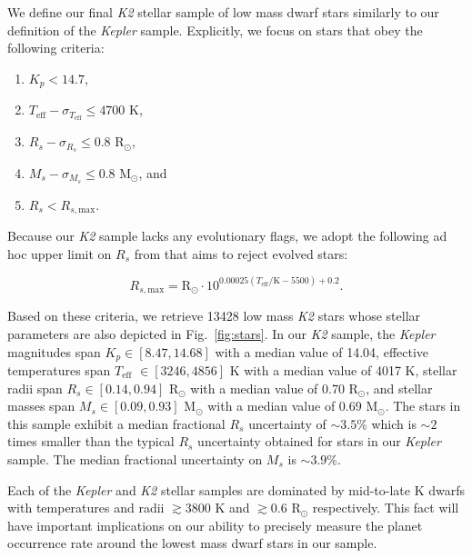 \documentclass[twocolumn]{emulateapj}
\newcommand{\kepler}[1]{\emph{Kepler}#1}
\newcommand{\ktwo}[1]{\emph{K2}#1}
\newcommand{\teff}[1]{$T_{\text{eff}}$#1}
\begin{document}
We define our final \ktwo{} stellar sample of low mass dwarf stars similarly to our definition of the \kepler{} sample.
Explicitly, we focus on stars that obey the following criteria:

\begin{enumerate}
\item $K_p < 14.7$,
\item $T_{\text{eff}} - \sigma_{T_{\text{eff}}} \leq 4700$ K,
\item $R_s - \sigma_{R_s} \leq 0.8$ R$_{\odot}$,
\item $M_s - \sigma_{M_s} \leq 0.8$ M$_{\odot}$, and
\item $R_s < R_{s,\text{max}}$.
\end{enumerate}

\noindent Because our \ktwo{} sample lacks any evolutionary flags, we adopt the following ad hoc upper limit on $R_s$
from \cite{fulton17} that aims to reject evolved stars:

\begin{equation}
  R_{s,\text{max}} = \text{R}_{\odot} \cdot 10^{0.00025(T_{\text{eff}}/\text{K}-5500)+0.2}.
\end{equation}

\noindent Based on these criteria, we retrieve 13428 low mass \ktwo{} stars whose
stellar parameters are also depicted in Fig.~\ref{fig:stars}.
In our \ktwo{} sample, the \kepler{} magnitudes span $K_p \in [8.47, 14.68]$ with a median value of 14.04,
effective temperatures span \teff{} $\in [3246, 4856]$ K with a median value of 4017 K,
stellar radii span $R_s \in [0.14, 0.94]$ R$_{\odot}$ with a median value of 0.70 R$_{\odot}$, and
stellar masses span $M_s \in [0.09, 0.93]$ M$_{\odot}$ with a median value of 0.69 M$_{\odot}$.
The stars in this sample exhibit a median fractional $R_s$ uncertainty of $\sim 3.5$\% which is $\sim 2$
times smaller than the typical $R_s$ uncertainty obtained for stars in our \kepler{} sample.
The median fractional uncertainty on $M_s$ is $\sim 3.9$\%.

Each of the \kepler{} and \ktwo{} stellar samples are dominated by mid-to-late K dwarfs
with temperatures and radii $\gtrsim 3800$ K and $\gtrsim 0.6$ R$_{\odot}$ respectively. This
fact will have important implications on our ability to precisely measure the planet occurrence
rate around the lowest mass dwarf stars in our sample.
\end{document}
